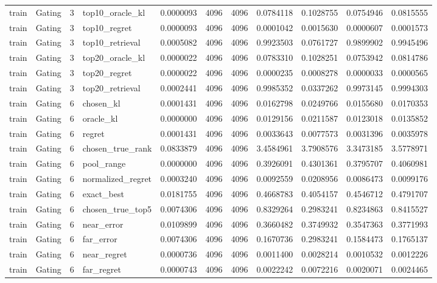 \begin{tabular}{llrlrrrrrrr}
train & Gating & 3 & top10_oracle_kl & 0.0000093 & 4096 & 4096 & 0.0784118 & 0.1028755 & 0.0754946 & 0.0815555 \\
train & Gating & 3 & top10_regret & 0.0000093 & 4096 & 4096 & 0.0001042 & 0.0015630 & 0.0000607 & 0.0001573 \\
train & Gating & 3 & top10_retrieval & 0.0005082 & 4096 & 4096 & 0.9923503 & 0.0761727 & 0.9899902 & 0.9945496 \\
train & Gating & 3 & top20_oracle_kl & 0.0000022 & 4096 & 4096 & 0.0783310 & 0.1028251 & 0.0753942 & 0.0814786 \\
train & Gating & 3 & top20_regret & 0.0000022 & 4096 & 4096 & 0.0000235 & 0.0008278 & 0.0000033 & 0.0000565 \\
train & Gating & 3 & top20_retrieval & 0.0002441 & 4096 & 4096 & 0.9985352 & 0.0337262 & 0.9973145 & 0.9994303 \\
train & Gating & 6 & chosen_kl & 0.0001431 & 4096 & 4096 & 0.0162798 & 0.0249766 & 0.0155680 & 0.0170353 \\
train & Gating & 6 & oracle_kl & 0.0000000 & 4096 & 4096 & 0.0129156 & 0.0211587 & 0.0123018 & 0.0135852 \\
train & Gating & 6 & regret & 0.0001431 & 4096 & 4096 & 0.0033643 & 0.0077573 & 0.0031396 & 0.0035978 \\
train & Gating & 6 & chosen_true_rank & 0.0833879 & 4096 & 4096 & 3.4584961 & 3.7908576 & 3.3473185 & 3.5778971 \\
train & Gating & 6 & pool_range & 0.0000000 & 4096 & 4096 & 0.3926091 & 0.4301361 & 0.3795707 & 0.4060981 \\
train & Gating & 6 & normalized_regret & 0.0003240 & 4096 & 4096 & 0.0092559 & 0.0208956 & 0.0086473 & 0.0099176 \\
train & Gating & 6 & exact_best & 0.0181755 & 4096 & 4096 & 0.4668783 & 0.4054157 & 0.4546712 & 0.4791707 \\
train & Gating & 6 & chosen_true_top5 & 0.0074306 & 4096 & 4096 & 0.8329264 & 0.2983241 & 0.8234863 & 0.8415527 \\
train & Gating & 6 & near_error & 0.0109899 & 4096 & 4096 & 0.3660482 & 0.3749932 & 0.3547363 & 0.3771993 \\
train & Gating & 6 & far_error & 0.0074306 & 4096 & 4096 & 0.1670736 & 0.2983241 & 0.1584473 & 0.1765137 \\
train & Gating & 6 & near_regret & 0.0000736 & 4096 & 4096 & 0.0011400 & 0.0028214 & 0.0010532 & 0.0012226 \\
train & Gating & 6 & far_regret & 0.0000743 & 4096 & 4096 & 0.0022242 & 0.0072216 & 0.0020071 & 0.0024465 \\

\end{tabular}
